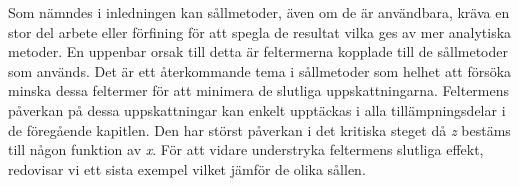 

Som nämndes i inledningen kan sållmetoder, även om de är användbara, kräva en stor del arbete eller förfining för att spegla de resultat vilka ges av mer analytiska metoder. 
En uppenbar orsak till  detta är feltermerna kopplade till de sållmetoder som används. 
Det är ett återkommande tema i sållmetoder som helhet att försöka minska dessa feltermer för att minimera de slutliga uppskattningarna.
Feltermens påverkan på dessa uppskattningar kan enkelt upptäckas i alla tillämpningsdelar i de föregående kapitlen.
Den har störst påverkan i det kritiska steget då \textit{z} bestäms till någon funktion av \textit{x}.
För att vidare understryka feltermens slutliga effekt, redovisar vi ett sista exempel vilket jämför de olika sållen.

